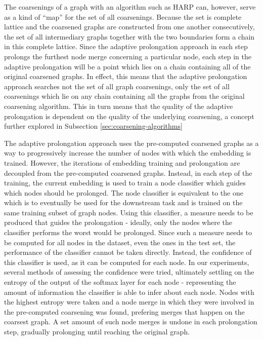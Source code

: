 The coarsenings of a graph with an algorithm such as HARP can, however, serve as a kind of \enquote{map} for the set of all coarsenings. Because the set is complete lattice and the coarsened graphs are constructed from one another consecutively, the set of all intermediary graphs together with the two boundaries form a chain in this complete lattice. Since the adaptive prolongation approach in each step prolongs the furthest node merge concerning a particular node, each step in the adaptive prolongation will be a point which lies on a chain containing all of the original coarsened graphs. In effect, this means that the adaptive prolongation approach searches not the set of all graph coarsenings, only the set of all coarsenings which lie on any chain containing all the graphs from the original coarsening algorithm. This in turn means that the quality of the adaptive prolongation is dependent on the quality of the underlying coarsening, a concept further explored in Subsection \ref{sec:coarsening-algorithms}

The adaptive prolongation approach uses the pre-computed coarsened graphs as a way to progressively increase the number of nodes with which the embedding is trained. However, the iterations of embedding training and prolongation are decoupled from the pre-computed coarsened graphs. Instead, in each step of the training, the current embedding is used to train a node classifier which guides which nodes should be prolonged. The node classifier is equivalent to the one which is to eventually be used for the downstream task and is trained on the same training subset of graph nodes. Using this classifier, a measure needs to be produced that guides the prolongation - ideally, only the nodes where the classifier performs the worst would be prolonged. Since such a measure needs to be computed for all nodes in the dataset, even the ones in the test set, the performance of the classifier cannot be taken directly. Instead, the confidence of this classifier is used, as it can be computed for each node. In our experiments, several methods of assessing the confidence were tried, ultimately settling on the entropy of the output of the softmax layer for each node - representing the amount of information the classifier is able to infer about each node. Nodes with the highest entropy were taken and a node merge in which they were involved in the pre-computed coarsening was found, prefering merges that happen on the coarsest graph. A set amount of such node merges is undone in each prolongation step, gradually prolonging until reaching the original graph.

